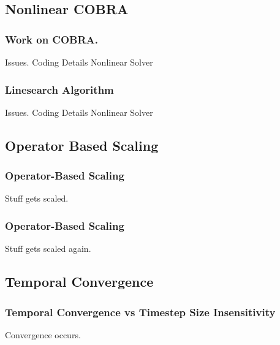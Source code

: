 \documentclass[compress,xcolor=table]{beamer}
\begin{document}
\subsection[COBRA]{Nonlinear COBRA}
\begin{frame}
\frametitle{Work on COBRA.}

Issues.
Coding Details
Nonlinear Solver


\end{frame}
\begin{frame}
\frametitle{Linesearch Algorithm}

Issues.
Coding Details
Nonlinear Solver


\end{frame}
\subsection[Scaling]{Operator Based Scaling}
\begin{frame}
\frametitle{Operator-Based Scaling}

Stuff gets scaled.

\end{frame}
\begin{frame}
\frametitle{Operator-Based Scaling}

Stuff gets scaled again.

\end{frame}
\subsection[Convergence]{Temporal Convergence}
\begin{frame}
\frametitle{Temporal Convergence vs Timestep Size Insensitivity}

Convergence occurs.

\end{frame}
\end{document}
